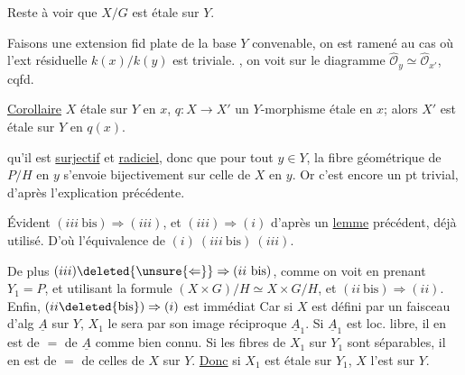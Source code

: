 Reste à voir que $X/G$ est étale sur $Y$.

\margin{$*\quad\unsure{\prime}$}

Faisons une extension fid plate de la base $Y$ convenable, on est ramené au cas où l'ext résiduelle $k(x)/k(y)$ est triviale.
, on voit sur le diagramme $\widehat{\mathcal O}_y\simeq\widehat{\mathcal O}_{x'}$, cqfd.


\uline{Corollaire}
 $X$ étale sur $Y$ en $x$, $q:X\to X'$ un $Y$-morphisme étale en $x$; alors $X'$ est étale sur $Y$ en $q(x)$.

qu'il est \uline{surjectif} et \uline{radiciel}, donc que pour tout $y\in Y$, la fibre géométrique de $P/H$  en $y$ s'envoie bijectivement sur celle de $X$ en $y$.
Or c'est encore un pt trivial, d'après l'explication précédente.


Évident $(iii\ \mathrm{bis})\Rightarrow(iii)$, et $(iii)\Rightarrow(i)$ d'après un \uline{lemme} précédent, déjà utilisé.
D'où l'équivalence de $(i)\ (iii\ \mathrm{bis})\ (iii)$.

De plus $(iii)\deleted{\unsure{\Leftarrow}}\Rightarrow(ii\ \mathrm{bis})$, comme on voit en prenant $Y_1=P$, et utilisant la formule
$(X\times G)/H\simeq X\times G/H$, et $(ii\ \mathrm{bis})\Rightarrow(ii)$.
Enfin, $(ii\deleted{\mathrm{bis}})\Rightarrow(i)$ est immédiat
\deleted{[car la condition \unsure{loc.}}
Car si $X$ est défini par un faisceau d'alg $\underline A$ sur $Y$, $X_1$ le sera par son image réciproque $\underline A_1$.
Si $\underline A_1$ est loc. libre, il en est de $=$ de $\underline A$ comme bien connu.
Si les fibres de $X_1$ sur $Y_1$ sont séparables,  il en est de $=$ de celles de $X$ sur $Y$.
\uline{Donc} si $X_1$ est étale sur $Y_1$, $X$ l'est sur $Y$.

